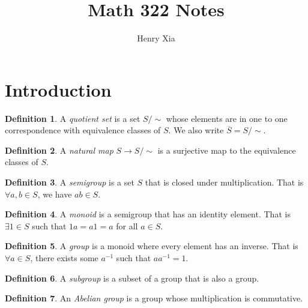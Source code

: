 \documentclass[11pt]{article}
\title{Math 322 Notes}
\author{Henry Xia}
\theoremstyle{definition}
\newtheorem{defn}{Definition}[section]
\begin{document}
\maketitle

\tableofcontents


\section{Introduction}

\begin{defn}
	A \emph{quotient set} is a set $S/\sim$ whose elements are in one to one correspondence
	with equivalence classes of $S$. We also write $\overline{S} = S/\sim$.
\end{defn}

\begin{defn}
	A \emph{natural map} $S\to S/\sim$ is a surjective map to the equivalence classes of
	$S$. 
\end{defn}



\begin{defn}
	A \emph{semigroup} is a set $S$ that is closed under multiplication. That is $\forall
	a,b\in S$, we have $ab\in S$. 
\end{defn}

\begin{defn}
	A \emph{monoid} is a semigroup that has an identity element. That is $\exists 1\in S$ such
	that $1a = a1 = a$ for all $a\in S$. 
\end{defn}

\begin{defn}
	A \emph{group} is a monoid where every element has an inverse. That is $\forall a\in S$,
	there exists some $a^{-1}$ such that $aa^{-1} = 1$. 
\end{defn}

\begin{defn}
	A \emph{subgroup} is a subset of a group that is also a group.
\end{defn}

\begin{defn}
	An \emph{Abelian group} is a group whose multiplication is commutative. 
\end{defn}
\end{document}
